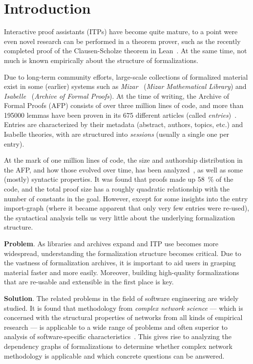 \section{Introduction}
Interactive proof assistants (ITPs) have become quite mature,
to a point were even novel research can be performed in a theorem prover,
such as the recently completed proof of the Clausen-Scholze theorem in Lean~\cite{Scholze2021Scholze}.
At the same time,
not much is known empirically about the structure of formalizations.

Due to long-term community efforts,
large-scale collections of formalized material exist in some (earlier) systems
such as \emph{Mizar}~\cite{Mizar1992Rudnicki} (\emph{Mizar Mathematical Library}) and \emph{Isabelle}~\cite{Isabelle1998Paulson} (\emph{Archive of Formal Proofs}).
At the time of writing, the Archive of Formal Proofs (AFP) consists of over three million lines of code,
and more than \num{195000} lemmas have been proven
in its \num{675} different articles (called \emph{entries})~\cite{Statistics2022Afp}.
Entries are characterized by their metadata (abstract, authors, topics, etc.)
and Isabelle theories, with are structured into \emph{sessions} (usually a single one per entry).

At the mark of one million lines of code,
the size and authorship distribution in the AFP, and how those evolved over time, has been analyzed~\cite{MiningAFP2015Blanchette},
as well as some (mostly) syntactic properties.
It was found that proofs made up \SI{58}{\percent} of the code,
and the total proof size has a roughly quadratic relationship with the number of constants in the goal.
However, except for some insights into the entry import-graph
(where it became apparent that only very few entries were re-used),
the syntactical analysis tells us very little about the underlying formalization structure.

\textbf{Problem}.
As libraries and archives expand and ITP use becomes more widespread,
understanding the formalization structure becomes critical.
Due to the vastness of formalization archives,
it is important to aid users in grasping material faster and more easily.
Moreover, building high-quality formalizations
that are re-usable and extensible in the first place is key.

\textbf{Solution}.
The related problems in the field of software engineering are widely studied.
It is found that methodology from \emph{complex network science} ---
which is concerned with the structural properties of networks from all kinds of empirical research ---
is applicable to a wide range of problems
and often superior to analysis of software-specific characteristics~\cite{DefectsMetrics2008Zimmermann,FractalDimension2013Turnu}.
This gives rise to analyzing the dependency graphs of formalizations
to determine whether complex network methodology is applicable
and which concrete questions can be answered.

